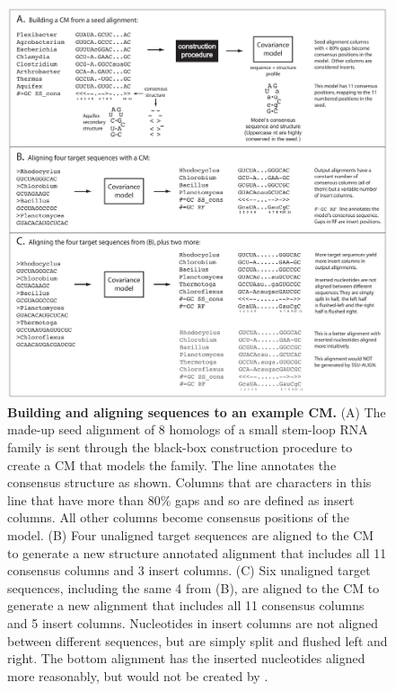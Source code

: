 \begin{figure}
\begin{center}
\includegraphics[width=6.5in]{Figures/sa-toy-example}
\end{center}
\caption{\textbf{Building and aligning sequences to an example CM.}
  (A) The made-up seed alignment of 8 homologs of a small stem-loop RNA
family is sent through the black-box construction procedure to create
a CM that models the family. The  line annotates
the consensus structure as shown. Columns that are  characters
in this line that have more than 80\% gaps and so are defined as insert
columns. All other columns become consensus positions of the
model. (B) Four unaligned target sequences
are aligned to the CM to generate a new structure annotated
alignment that includes all 11 consensus columns and 3 insert
columns. (C) Six unaligned target sequences, including the same 4 from
(B), are aligned to the CM to generate a new alignment that includes
all 11 consensus columns and 5 insert columns. Nucleotides in insert
columns are not aligned between different sequences, but are simply
split and flushed left and right. The bottom alignment has the
inserted nucleotides aligned more reasonably, but would not be created
by .}
\label{fig:toyex}
\end{figure}


